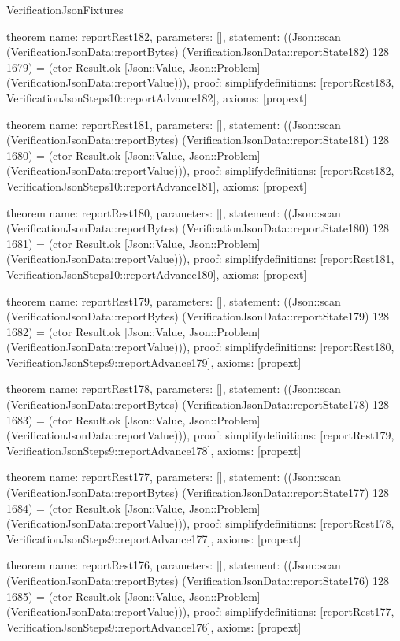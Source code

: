 \begin{lexlean}{VerificationJsonFixtures}
\begin{semanticmodule}
theorem{
  name: reportRest182,
  parameters: [],
  statement: ((Json::scan (VerificationJsonData::reportBytes) (VerificationJsonData::reportState182) 128 1679) = (ctor Result.ok [Json::Value, Json::Problem] (VerificationJsonData::reportValue))),
  proof: simplify{definitions: [reportRest183, VerificationJsonSteps10::reportAdvance182]},
  axioms: [propext]
}

theorem{
  name: reportRest181,
  parameters: [],
  statement: ((Json::scan (VerificationJsonData::reportBytes) (VerificationJsonData::reportState181) 128 1680) = (ctor Result.ok [Json::Value, Json::Problem] (VerificationJsonData::reportValue))),
  proof: simplify{definitions: [reportRest182, VerificationJsonSteps10::reportAdvance181]},
  axioms: [propext]
}

theorem{
  name: reportRest180,
  parameters: [],
  statement: ((Json::scan (VerificationJsonData::reportBytes) (VerificationJsonData::reportState180) 128 1681) = (ctor Result.ok [Json::Value, Json::Problem] (VerificationJsonData::reportValue))),
  proof: simplify{definitions: [reportRest181, VerificationJsonSteps10::reportAdvance180]},
  axioms: [propext]
}

theorem{
  name: reportRest179,
  parameters: [],
  statement: ((Json::scan (VerificationJsonData::reportBytes) (VerificationJsonData::reportState179) 128 1682) = (ctor Result.ok [Json::Value, Json::Problem] (VerificationJsonData::reportValue))),
  proof: simplify{definitions: [reportRest180, VerificationJsonSteps9::reportAdvance179]},
  axioms: [propext]
}

theorem{
  name: reportRest178,
  parameters: [],
  statement: ((Json::scan (VerificationJsonData::reportBytes) (VerificationJsonData::reportState178) 128 1683) = (ctor Result.ok [Json::Value, Json::Problem] (VerificationJsonData::reportValue))),
  proof: simplify{definitions: [reportRest179, VerificationJsonSteps9::reportAdvance178]},
  axioms: [propext]
}

theorem{
  name: reportRest177,
  parameters: [],
  statement: ((Json::scan (VerificationJsonData::reportBytes) (VerificationJsonData::reportState177) 128 1684) = (ctor Result.ok [Json::Value, Json::Problem] (VerificationJsonData::reportValue))),
  proof: simplify{definitions: [reportRest178, VerificationJsonSteps9::reportAdvance177]},
  axioms: [propext]
}

theorem{
  name: reportRest176,
  parameters: [],
  statement: ((Json::scan (VerificationJsonData::reportBytes) (VerificationJsonData::reportState176) 128 1685) = (ctor Result.ok [Json::Value, Json::Problem] (VerificationJsonData::reportValue))),
  proof: simplify{definitions: [reportRest177, VerificationJsonSteps9::reportAdvance176]},
  axioms: [propext]
}


\end{semanticmodule}
\end{lexlean}
